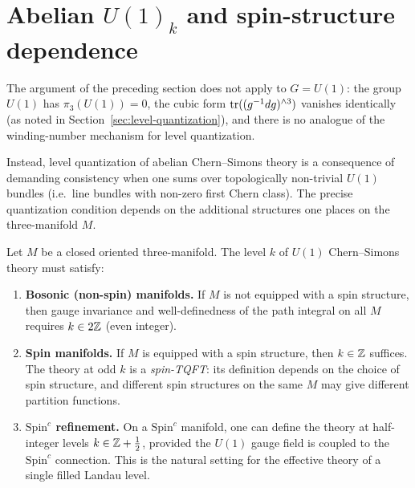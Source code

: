 \section{Abelian \texorpdfstring{$U(1)_k$}{U(1)\_k} and spin-structure dependence}\label{sec:appC-abelian}

The argument of the preceding section does not apply to $G = U(1)$: the group $U(1)$ has $\pi_3(U(1))=0$, the cubic form $\operatorname{tr}((g^{-1}dg)^{\wedge 3})$ vanishes identically (as noted in Section~\ref{sec:level-quantization}), and there is no analogue of the winding-number mechanism for level quantization.

Instead, level quantization of abelian Chern--Simons theory is a consequence of demanding consistency when one sums over topologically non-trivial $U(1)$ bundles (i.e.\ line bundles with non-zero first Chern class). The precise quantization condition depends on the additional structures one places on the three-manifold $M$.

\begin{proposition}\label{prop:appC-U1-levels}
Let $M$ be a closed oriented three-manifold. The level $k$ of $U(1)$ Chern--Simons theory must satisfy:
\begin{enumerate}
\item[\emph{(a)}] \textbf{Bosonic (non-spin) manifolds.} If $M$ is not equipped with a spin structure, then gauge invariance and well-definedness of the path integral on all $M$ requires $k\in 2\mathbb{Z}$ (even integer).
\item[\emph{(b)}] \textbf{Spin manifolds.} If $M$ is equipped with a spin structure, then $k\in\mathbb{Z}$ suffices. The theory at odd $k$ is a \emph{spin-TQFT}: its definition depends on the choice of spin structure, and different spin structures on the same $M$ may give different partition functions.
\item[\emph{(c)}] \textbf{$\mathrm{Spin}^c$ refinement.} On a $\mathrm{Spin}^c$ manifold, one can define the theory at half-integer levels $k\in \mathbb{Z} + \frac{1}{2}$, provided the $U(1)$ gauge field is coupled to the $\mathrm{Spin}^c$ connection. This is the natural setting for the effective theory of a single filled Landau level.
\end{enumerate}
\end{proposition}

